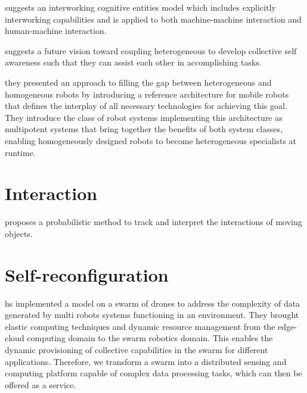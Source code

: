 \documentclass{article}
\begin{document}
	\cite{celentano-2016-multi-robot-systems-machine-machine-and-human-machine-interaction-and-their-modelling} suggests an interworking cognitive entities model which includes explicitly interworking capabilities and is applied to both machine-machine interaction and human-machine interaction.
	
	
	\cite{diaconescu-2017-architectures-for-collective-self-aware-computing-systems}
	\cite{gerasimou-2019-towards-systematic-engineering-of-collaborative-heterogeneous-robotic-systems} suggests a future vision toward coupling heterogeneous to develop collective self awareness such that they can assist each other in accomplishing tasks.
	
	\cite{kosak-2019-multipotent-systems-combining-planning-self-organization-and-reconfiguration-in-modular-robot-ensembles} they presented an approach to filling the gap between heterogeneous and homogeneous robots by introducing a reference architecture for mobile robots that defines the interplay of all necessary technologies for achieving this goal. They introduce the class of robot systems implementing this architecture as multipotent systems that bring together the benefits of both system classes, enabling homogeneously designed robots to become heterogeneous specialists at runtime.
	
	
	
	\section{Interaction}
	\cite{baydoun-2019-prediction-of-multi-target-dynamics-using-discrete-descriptors-an-interactive-approach} proposes a probabilistic method to track and interpret the interactions of moving objects.
		
	\section{Self-reconfiguration}
		\cite{pena-2019-blockchain-powered-collaboration-in-heterogeneous-swarms-of-robots} hs implemented a model on a swarm of drones to address the complexity of data generated by multi robots systems functioning in an environment. They  brought elastic computing techniques and dynamic resource management from the edge-cloud computing domain to the swarm robotics domain. This enables the dynamic provisioning of collective capabilities in the swarm for
		different applications. Therefore, we transform a swarm into a distributed sensing and computing platform capable of complex data processing tasks, which can then be offered as a service.
	
\end{document}
